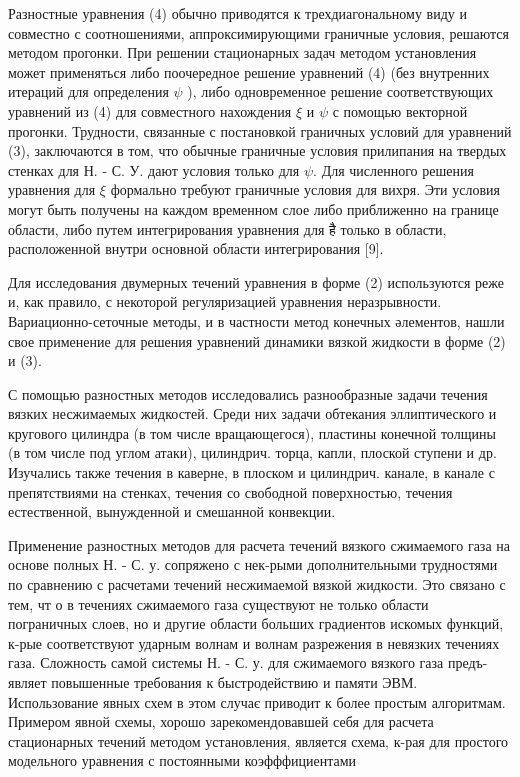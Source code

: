\documentclass[10pt]{article}
\begin{document}
Разностные уравнения (4) обычно приводятся к трехдиагональному виду и совместно с соотношениями, аппроксимирующими граничные условия, решаются методом прогонки. При решении стационарных задач методом установления может применяться либо поочередное решение уравнений (4) (без внутренних итераций для определения $\psi$ ), либо одновременное решение соответствующих уравнений из (4) для совместного нахождения $\xi$ и $\psi$ с помощью векторной прогонки. Трудности, связанные с постановкой граничных условий для уравнений (3), заключаются в том, что обычные граничные условия прилипания на твердых стенках для Н. - С. У. дают условия только для $\psi$. Для численного решения уравнения для $\xi$ формально требуют граничные условия для вихря. Эти условия могут быть получены на каждом временном слое либо приближенно на границе области, либо путем интегрирования уравнения для है только в области, расположенной внутри основной области интегрирования [9].



Для исследования двумерных течений уравнения в форме (2) используются реже и, как правило, с некоторой регуляризацией уравнения неразрывности. Вариационно-сеточные методы, и в частности метод конечных әлементов, нашли свое применение для решения уравнений динамики вязкой жидкости в форме (2) и (3).



С помощью разностных методов исследовались разнообразные задачи течения вязких несжимаемых жидкостей. Среди них задачи обтекания эллиптического и кругового цилиндра (в том числе вращающегося), пластины конечной толщины (в том числе под углом атаки), цилиндрич. торца, капли, плоской ступени и др. Изучались также течения в каверне, в плоском и цилиндрич. канале, в канале с препятствиями на стенках, течения со свободной поверхностью, течения естественной, вынужденной и смешанной конвекции.



Применение разностных методов для расчета течений вязкого сжимаемого газа на основе полных Н. - С. у. сопряжено с нек-рыми дополнительными трудностями по сравнению с расчетами течений несжимаемой вязкой жидкости. Это связано с тем, чт о в течениях сжимаемого газа существуют не только области пограничных слоев, но и другие области больших градиентов искомых функций, к-рые соответствуют ударным волнам и волнам разрежения в невязких течениях газа. Сложность самой системы Н. - С. у. для сжимаемого вязкого газа предъ- являет повышенные требования к быстродействию и памяти ЭВМ. Использование явных схем в этом случає приводит к более простым алгоритмам. Примером явной схемы, хорошо зарекомендовавшей себя для расчета стационарных течений методом установления, является схема, к-рая для простого модельного уравнения с постоянными коэфффициентами
\end{document}
